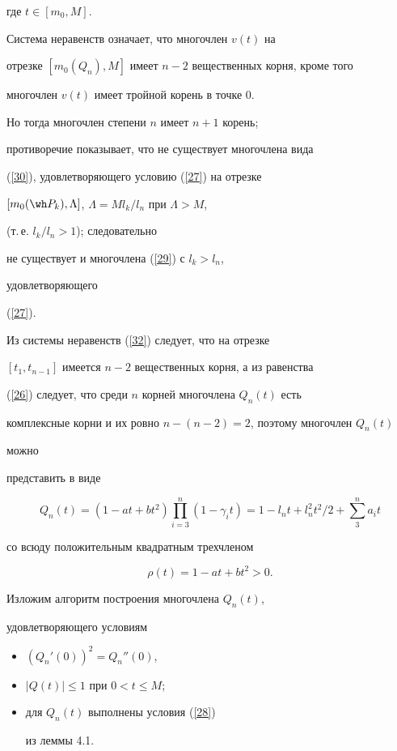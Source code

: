 где $t\in [m_0,M]$.


Система неравенств означает, что многочлен $v(t)$ на


отрезке $[m_0(Q_n),M]$ имеет $n-2$ вещественных корня, кроме того


многочлен $v(t)$ имеет тройной корень в точке 0.


Но тогда многочлен степени $n$ имеет $n+1$ корень;


противоречие показывает, что не существует многочлена вида


(\ref{30}), удовлетворяющего условию (\ref{27}) на отрезке


$[m_0(\wh P_k),\Lambda]$, $\Lambda =M l_k/l_n$ при $\Lambda>M$,


(т.\,е.{} $l_k/l_n>1$); следовательно


не существует и многочлена (\ref{29}) с $l_k>l_n$,


удовлетворяющего


(\ref{27}).





Из системы неравенств (\ref{32}) следует, что на отрезке


$[t_1,t_{n-1}]$ имеется $n-2$ вещественных корня, а из равенства


(\ref{26}) следует, что среди $n$ корней многочлена $Q_n(t)$ есть


комплексные корни и их ровно $n-(n-2)=2$, поэтому многочлен $Q_n(t)$


можно


представить в виде


\begin{equation}


Q_n(t)=(1-at+bt^2) \prod_{i=3}^{n}(1-\gamma_i t)=


1-l_n t+l^2_n t^2/2+ \sum_{3}^{n} a_i t


\label{33}


\end{equation}


со всюду положительным квадратным трехчленом


$$


\rho(t)=1-at+bt^2>0.


$$





Изложим алгоритм построения многочлена $Q_n(t)$,


удовлетворяющего условиям


\begin{itemize}


\item[1)] $(Q_n'(0))^2 =Q_n''(0)$,


\item[2)] $|Q (t)|\le 1$ при $0<t\le M$;


\item[3)] для $Q_n(t)$ выполнены условия (\ref{28})


из леммы 4.1.


\end{itemize}





